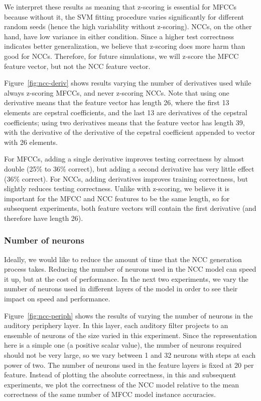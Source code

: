 We interpret these results
as meaning that z-scoring is essential
for MFCCs because without it,
the SVM fitting procedure
varies significantly for
different random seeds
(hence the high variability without z-scoring).
NCCs, on the other hand,
have low variance in either condition.
Since a higher test correctness indicates
better generalization,
we believe that z-scoring
does more harm than good for NCCs.
Therefore, for future simulations,
we will z-score the MFCC feature vector,
but not the NCC feature vector.


Figure~\ref{fig:ncc-deriv} shows
results varying the number of derivatives
used while always z-scoring MFCCs,
and never z-scoring NCCs.
Note that using one derivative means
that the feature vector has
length 26,
where the first 13 elements
are cepstral coefficients,
and the last 13 are derivatives
of the cepstral coefficients;
using two derivatives means that
the feature vector has length 39,
with the derivative of the
derivative of the cepstral coefficient
appended to vector with 26 elements.

For MFCCs, adding a single derivative
improves testing correctness
by almost double
(25\% to 36\% correct),
but adding a second derivative
has very little effect
(36\% correct).
For NCCs, adding derivatives
improves training correctness,
but slightly reduces testing correctness.
Unlike with z-scoring,
we believe it is important
for the MFCC and NCC features to
be the same length,
so for subsequent experiments,
both feature vectors
will contain the first derivative
(and therefore have length 26).

\subsubsection{Number of neurons}

Ideally,
we would like to reduce the amount of time
that the NCC generation process takes.
Reducing the number of neurons
used in the NCC model
can speed it up,
but at the cost of performance.
In the next two experiments,
we vary the number of neurons used
in different layers of the model
in order to see their impact
on speed and performance.


Figure~\ref{fig:ncc-periph} shows the results of
varying the number of neurons
in the auditory periphery layer.
In this layer,
each auditory filter projects
to an ensemble of neurons
of the size varied in this experiment.
Since the representation here
is a simple one
(a positive scalar value),
the number of neurons required
should not be very large,
so we vary between
1 and 32 neurons with steps
at each power of two.
The number of neurons used
in the feature layers
is fixed at 20 per feature.
Instead of plotting the absolute correctness,
in this and subsequent experiments,
we plot the correctness of the NCC model
relative to the mean correctness
of the same number
of MFCC model instance accuracies.

